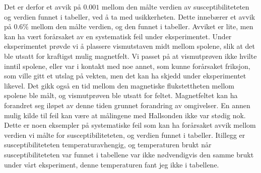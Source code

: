 \documentclass[%
 reprint,
 amsmath,amssymb,
 aps,
 norsk,
]{revtex4-1}
\begin{document}
Det er derfor et avvik på $0.001$ mellom den målte verdien av susceptibiliteteten og verdien funnet i tabeller, ved å ta med usikkerheten. Dette innebærer et avvik på $0.6\%$ mellom den målte verdien, og den funnet i tabeller. Avviket er lite, men kan ha vært forårsaket av en systematisk feil under eksperimentet. Under eksperimentet prøvde vi å plassere vismutstaven midt mellom spolene, slik at det ble utsatt for kraftigst mulig magnetfelt. Vi passet på at vismutprøven ikke hvilte inntil spolene, eller var i kontakt med noe annet, som kunne forårsaket friksjon, som ville gitt et utslag på vekten, men det kan ha skjedd under eksperimentet likevel. Det gikk også en tid mellom den magnetiske flukstettheten mellom spolene ble målt, og vismutprøven ble utsatt for feltet. Magnetfeltet kan ha forandret seg iløpet av denne tiden grunnet forandring av omgivelser. En annen mulig kilde til feil kan være at målingene med Hallsonden ikke var stødig nok. Dette er noen eksempler på systematiske feil som kan ha forårsaket avvik mellom verdien vi målte for susceptibiliteteten, og verdien funnet i tabeller. Itillegg er susceptibiliteteten temperaturavhengig, og temperaturen brukt når susceptibiliteteten var funnet i tabellene var ikke nødvendigvis den samme brukt under vårt eksperiment, denne temperaturen fant jeg ikke i tabellene.
\end{document}
